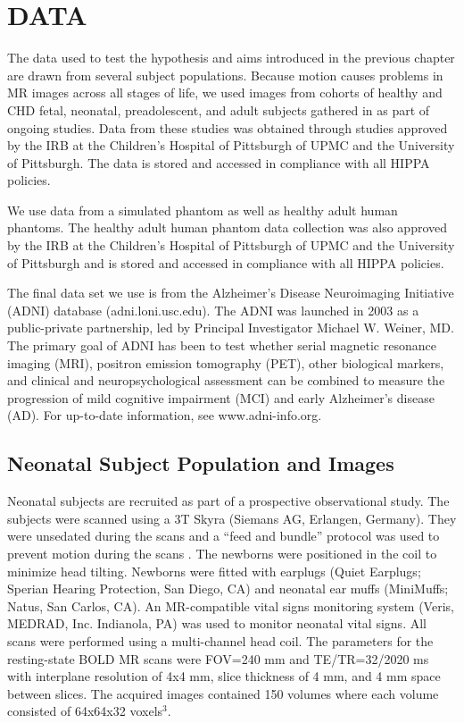 \chapter{DATA}
\label{ch:data}

The data used to test the hypothesis and aims introduced in the previous chapter are drawn from several subject populations. Because motion causes problems in MR images across all stages of life, we used images from cohorts of healthy and CHD fetal, neonatal, preadolescent, and adult subjects gathered in as part of ongoing studies. Data from these studies was obtained through studies approved by the IRB at the Children's Hospital of Pittsburgh of UPMC and the University of Pittsburgh. The data is stored and accessed in compliance with all HIPPA policies.

We use data from a simulated phantom as well as healthy adult human phantoms. The healthy adult human phantom data collection was also approved by the IRB at the Children's Hospital of Pittsburgh of UPMC and the University of Pittsburgh and is stored and accessed in compliance with all HIPPA policies.

The final data set we use is from the Alzheimer's Disease Neuroimaging Initiative (ADNI) database (adni.loni.usc.edu). The ADNI was launched in 2003 as a public-private partnership, led by Principal Investigator Michael W. Weiner, MD. The primary goal of ADNI has been to test whether serial magnetic resonance imaging (MRI), positron emission tomography (PET), other biological markers, and clinical and neuropsychological assessment can be combined to measure the progression of mild cognitive impairment (MCI) and early Alzheimer's disease (AD). For up-to-date information, see www.adni-info.org.

\section{Neonatal Subject Population and Images}

Neonatal subjects are recruited as part of a prospective observational study. The subjects were scanned using a 3T Skyra (Siemans AG, Erlangen, Germany). They were unsedated during the scans and a ``feed and bundle'' protocol was used to prevent motion during the scans \cite{Windram2011}. The newborns were positioned in the coil to minimize head tilting. Newborns were fitted with earplugs (Quiet Earplugs; Sperian Hearing Protection, San Diego, CA) and neonatal ear muffs (MiniMuffs; Natus, San Carlos, CA). An MR-compatible vital signs monitoring system (Veris, MEDRAD, Inc. Indianola, PA) was used to monitor neonatal vital signs. All scans were performed using a multi-channel head coil. The parameters for the resting-state BOLD MR scans were FOV=240 mm and TE/TR=32/2020 ms with interplane resolution of 4x4 mm, slice thickness of 4 mm, and 4 mm space between slices. The acquired images contained 150 volumes where each volume consisted of 64x64x32 voxels$^3$.

